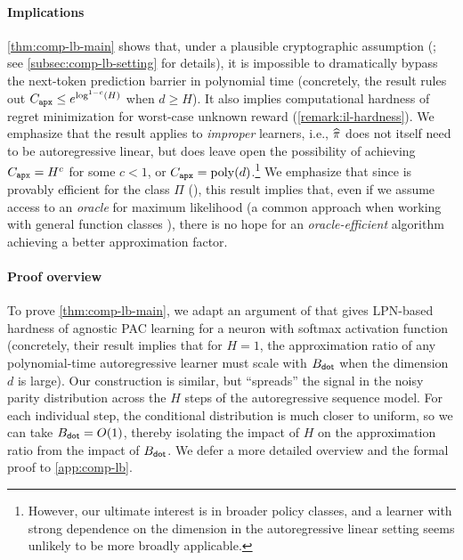 \paragraph{Implications} \cref{thm:comp-lb-main} shows that, under a plausible cryptographic assumption (\citet{yu2021smoothing}; see \cref{subsec:comp-lb-setting} for details), it is impossible to dramatically bypass the next-token prediction barrier in polynomial time (concretely, the result rules out $C_{\texttt{apx}}\leq{}e^{\log^{1-c}(H)}$ when $d\geq{}H$). It also implies computational hardness of regret minimization for worst-case unknown reward (\cref{remark:il-hardness}). We emphasize that the result applies to \emph{improper} learners, i.e., $\widehat{\pi}$ does not itself need to be autoregressive linear, but does leave open the possibility of achieving $C_{\texttt{apx}}=H^{c}$ for some $c<1$, or $C_{\texttt{apx}}=\mathrm{poly}(d)$.\footnote{However, our ultimate interest is in broader policy classes, and a learner with strong dependence on the dimension in the autoregressive linear setting seems unlikely to be more broadly applicable.}  We emphasize that since \loglossbc is provably efficient for the class $\Pi$ (), this result implies that, even if we assume access to an \emph{oracle} for maximum likelihood (a common approach when working with general function classes \citep{foster2021statistical,foster2023foundations}), there is no hope for an \emph{oracle-efficient} algorithm achieving a better approximation factor.
  
\loose




\paragraph{Proof overview}
To prove \cref{thm:comp-lb-main}, we adapt an argument of \cite{diakonikolas2022hardness} that gives LPN-based hardness of agnostic PAC learning for a neuron with softmax activation function (concretely, their result implies that for $H = 1$, the approximation ratio of any polynomial-time autoregressive learner must scale with $B_{\mathsf{dot}}$ when the dimension $d$ is large). Our construction is similar, but ``spreads'' the signal in the noisy parity distribution across the $H$ steps of the autoregressive sequence model. For each individual step, the conditional distribution is much closer to uniform, so we can take $B_{\mathsf{dot}}=O(1)$, thereby isolating the impact of $H$ on the approximation ratio from the impact of $B_{\mathsf{dot}}$. We defer a more detailed overview and the formal proof to \cref{app:comp-lb}.

